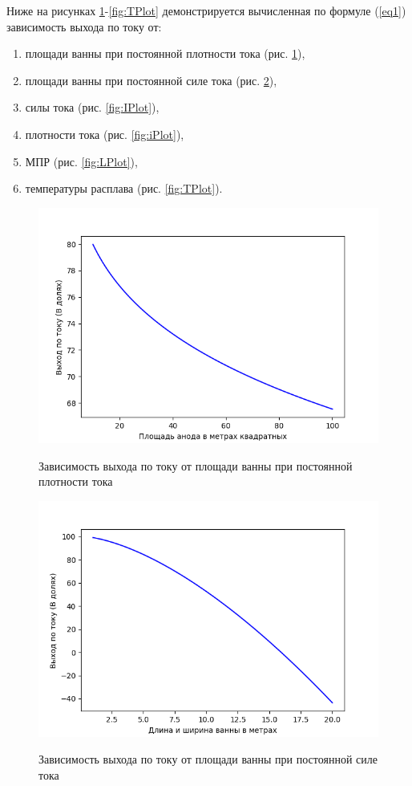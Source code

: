 \documentclass{article}
\begin{document}
Ниже на рисунках \ref{fig:SPlot}-\ref{fig:TPlot} демонстрируется вычисленная по формуле (\ref{eq1}) зависимость выхода по току от:
\begin{enumerate}
\item площади ванны при постоянной плотности тока (рис. \ref{fig:SPlot}),
\item площади ванны при постоянной силе тока (рис. \ref{fig:SaPlot}),
\item силы тока (рис. \ref{fig:IPlot}),
\item плотности тока (рис. \ref{fig:iPlot}),
\item МПР (рис. \ref{fig:LPlot}),
\item температуры расплава (рис. \ref{fig:TPlot}).
\end{enumerate}
\begin{figure}[H]
\centering
\includegraphics[width=0.8\linewidth]{S.png}
\caption{}
\label{fig:SPlot}
Зависимость выхода по току от площади ванны при постоянной плотности тока
\end{figure}

\begin{figure}[H]
\centering
\includegraphics[width=0.8\linewidth]{Sa.png}
\caption{}
\label{fig:SaPlot}
Зависимость выхода по току от площади ванны при постоянной силе тока
\end{figure}
\end{document}
